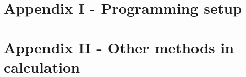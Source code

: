 \chapter{Appendix I - Programming setup}
\label{sec:appendix}
\blindtext[3]

\chapter{Appendix II - Other methods in calculation}
\label{sec:appendix2}
\blindtext[3]